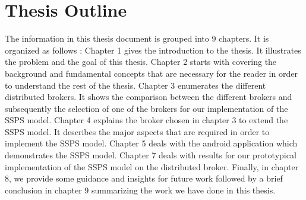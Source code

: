 \section{Thesis Outline}

The information in this thesis document is grouped into 9 chapters. It is organized as follows : Chapter 1 gives the introduction to the thesis. It illustrates the problem and the goal of this thesis. Chapter 2 starts with covering the background and fundamental concepts that are necessary for the reader in order to understand the rest of the thesis. Chapter 3 enumerates the different distributed brokers. It shows the comparison between the different brokers and subsequently the selection of one of the brokers for our implementation of the SSPS model. Chapter 4 explains the broker chosen in chapter 3 to extend the SSPS model. It describes the major aspects that are required in order to implement the SSPS model. Chapter 5 deals with the android application which demonstrates the SSPS model. Chapter 7 deals with results for our prototypical implementation of the SSPS model on the distributed broker. Finally, in chapter 8, we provide some guidance and insights for future work followed by a brief conclusion in chapter 9 summarizing the work we have done in this thesis.